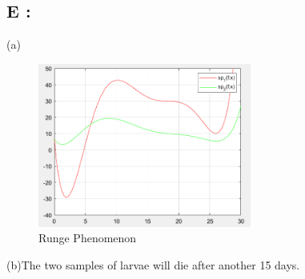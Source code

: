 \documentclass{ctexart}
\begin{document}
\subsection*{E :}
\begin{flushleft}
  (a) \\
  \begin{figure}[H]
  \centering
    \centering
    \includegraphics[width=7cm]{5}
    \caption{Runge Phenomenon}
  \end{figure}

  (b)The two samples of larvae will die after another 15 days.
\end{flushleft}
\end{document}
